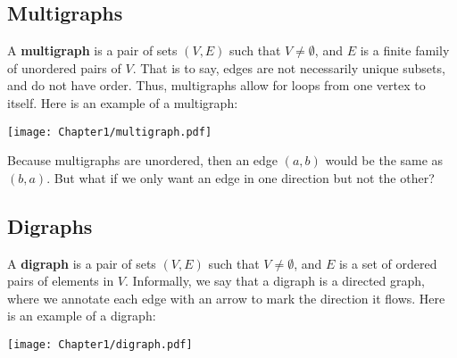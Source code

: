 \subsection{Multigraphs}
A \textbf{multigraph} is a pair of sets $(V, E)$ such that $V \neq \emptyset$, and $E$ is a finite family of unordered pairs of $V$. That is to say, edges are not necessarily unique subsets, and do not have order. Thus, multigraphs allow for loops from one vertex to itself. Here is an example of a multigraph:

\begin{center}
    \texttt{[image: Chapter1/multigraph.pdf]}
\end{center}

Because multigraphs are unordered, then an edge $(a, b)$ would be the same as $(b, a)$. But what if we only want an edge in one direction but not the other?
\subsection{Digraphs}
A \textbf{digraph} is a pair of sets $(V, E)$ such that $V \neq \emptyset$, and $E$ is a set of ordered pairs of elements in $V$. Informally, we say that a digraph is a directed graph, where we annotate each edge with an arrow to mark the direction it flows. Here is an example of a digraph:

\begin{center}
    \texttt{[image: Chapter1/digraph.pdf]}
\end{center}

